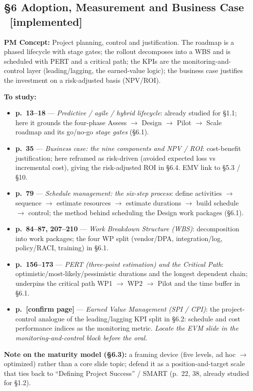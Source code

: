 \documentclass[12pt,a4paper]{article}
\newcommand{\statusdone}{\textcolor{donegreen}{\small\textbf{[implemented]}}}
\newcommand{\slide}[3]{\item \textbf{p.~#1} --- \textit{#2}: #3}
\newcommand{\concetto}[1]{\textbf{PM Concept:} #1\par\vspace{2pt}}
\begin{document}
\subsection{\S6 Adoption, Measurement and Business Case \ \statusdone}
\concetto{Project planning, control and justification. The roadmap is a phased lifecycle with stage gates; the rollout decomposes into a WBS and is scheduled with PERT and a critical path; the KPIs are the monitoring-and-control layer (leading/lagging, the earned-value logic); the business case justifies the investment on a risk-adjusted basis (NPV/ROI).}
\textbf{To study:}
\begin{itemize}
  \slide{13--18}{Predictive / agile / hybrid lifecycle}{already studied for \S1.1; here it grounds the four-phase Assess $\to$ Design $\to$ Pilot $\to$ Scale roadmap and its go/no-go \emph{stage gates} (\S6.1).}
  \slide{35}{Business case: the nine components and NPV / ROI}{cost-benefit justification; here reframed as risk-driven (avoided expected loss vs incremental cost), giving the risk-adjusted ROI in \S6.4. EMV link to \S5.3 / \S10.}
  \slide{79}{Schedule management: the six-step process}{define activities $\to$ sequence $\to$ estimate resources $\to$ estimate durations $\to$ build schedule $\to$ control; the method behind scheduling the Design work packages (\S6.1).}
  \slide{84--87, 207--210}{Work Breakdown Structure (WBS)}{decomposition into work packages; the four WP split (vendor/DPA, integration/log, policy/RACI, training) in \S6.1.}
  \slide{156--173}{PERT (three-point estimation) and the Critical Path}{optimistic/most-likely/pessimistic durations and the longest dependent chain; underpins the critical path WP1 $\to$ WP2 $\to$ Pilot and the time buffer in \S6.1.}
  \slide{[confirm page]}{Earned Value Management (SPI / CPI)}{the project-control analogue of the leading/lagging KPI split in \S6.2: schedule and cost performance indices as the monitoring metric. \emph{Locate the EVM slide in the monitoring-and-control block before the oral.}}
\end{itemize}
\textbf{Note on the maturity model (\S6.3):} a framing device (five levels, ad hoc $\to$ optimized) rather than a core slide topic; defend it as a position-and-target scale that ties back to ``Defining Project Success'' / SMART (p.~22, 38, already studied for \S1.2).

\end{document}
